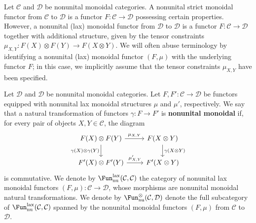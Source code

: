 \begin{remark}
Let $\mathcal{C}$ and $\mathcal{D}$ be nonunital monoidal categories. A nonunital strict monoidal functor from $\mathcal{C}$ to $\mathcal{D}$ is a functor $F:\mathcal{C}\to\mathcal{D}$ possessing certain properties. However, a nonunital (lax) monoidal functor from $\mathcal{D}$ to $\mathcal{D}$ is a functor $F:\mathcal{C}\to\mathcal{D}$ together with additional structure, given by the tensor constraints $\mu_{X,Y}:F(X)\otimes F(Y)\to F(X\otimes Y)$. We will often abuse terminology by identifying a nonunital (lax) monoidal functor $(F,\mu)$ with the underlying functor $F$; in this case, we implicitly assume that the tensor constraints $\mu_{X,Y}$ have been specified.
\end{remark}
Let $\mathcal{D}$ and $\mathcal{D}$ be nonunital monoidal categories. Let $F,F':\mathcal{C}\to\mathcal{D}$ be functors equipped with nonunital lax monoidal structures $\mu$ and $\mu'$, respectively. We say that a natural transformation of functors $\gamma:F\to F'$ is \textbf{nonunital monoidal} if, for every pair of objects $X,Y\in\mathcal{C}$, the diagram
\[\begin{tikzcd}
F(X)\otimes F(Y)\ar[d,swap,"\gamma(X)\otimes\gamma(Y)"]\ar[r,"\mu_{X,Y}"]&F(X\otimes Y)\ar[d,"\gamma(X\otimes Y)"]\\
F'(X)\otimes F'(Y)\ar[r,"\mu'_{X,Y}"]&F'(X\otimes Y)
\end{tikzcd}\]
is commutative. We denote by $\Fun^{\mathrm{lax}}_{\mathrm{nu}}(\mathcal{C},\mathcal{C})$ the category of nonunital lax monoidal functors $(F,\mu):\mathcal{C}\to\mathcal{D}$, whose morphisms are nonunital monoidal natural transformations. We denote by $\Fun_{\mathrm{nu}}^{\otimes}(\mathcal{C},\mathcal{D})$ denote the full subcategory of $\Fun^{\mathrm{lax}}_{\mathrm{nu}}(\mathcal{C},\mathcal{C})$ spanned by the nonunital monoidal functors $(F,\mu)$ from $\mathcal{C}$ to $\mathcal{D}$.
